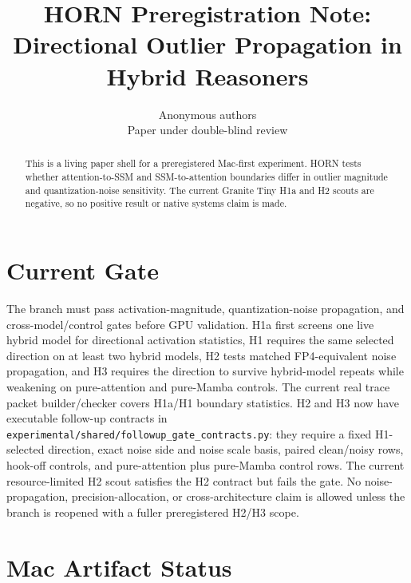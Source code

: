 \documentclass{article}
\title{HORN Preregistration Note: Directional Outlier Propagation in Hybrid Reasoners}
\author{Anonymous authors\\Paper under double-blind review}
\begin{document}
\maketitle

\begin{abstract}
This is a living paper shell for a preregistered Mac-first experiment. HORN
tests whether attention-to-SSM and SSM-to-attention boundaries differ in
outlier magnitude and quantization-noise sensitivity. The current Granite Tiny
H1a and H2 scouts are negative, so no positive result or native systems claim is
made.
\end{abstract}

\section{Current Gate}

The branch must pass activation-magnitude, quantization-noise propagation, and
cross-model/control gates before GPU validation.
H1a first screens one live hybrid model for directional activation statistics,
H1 requires the same selected direction on at least two hybrid models, H2 tests matched
FP4-equivalent noise propagation, and H3 requires the direction to survive
hybrid-model repeats while weakening on pure-attention and pure-Mamba controls.
The current real trace packet builder/checker covers H1a/H1 boundary
statistics. H2 and H3 now have executable follow-up contracts in
\texttt{experimental/shared/followup\_gate\_contracts.py}: they require a fixed
H1-selected direction, exact noise side and noise scale basis, paired
clean/noisy rows, hook-off controls, and pure-attention plus pure-Mamba control
rows. The current resource-limited H2 scout satisfies the H2 contract but
fails the gate. No noise-propagation, precision-allocation, or
cross-architecture claim is allowed unless the branch is reopened with a fuller
preregistered H2/H3 scope.

\section{Mac Artifact Status}
\end{document}
